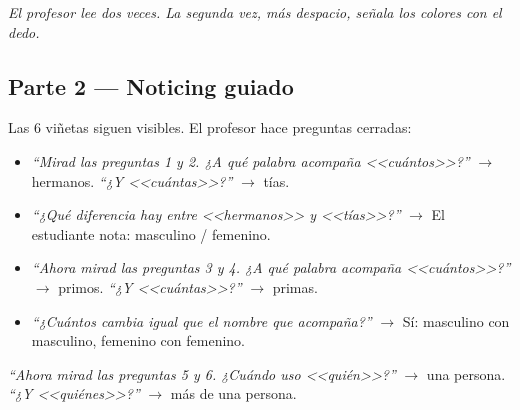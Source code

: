 \documentclass[a4paper,10pt]{article}
\begin{document}
\vspace{0.15cm}

{\small\textit{El profesor lee dos veces. La segunda vez, más despacio, señala los colores con el dedo.}}

\vspace{0.4cm}

\subsection*{\textcolor{naranja}{Parte 2 --- Noticing guiado}}

{\small Las 6 viñetas siguen visibles. El profesor hace preguntas cerradas:}

\vspace{0.2cm}

\begin{tcolorbox}[colback=naranja!5, colframe=naranja!60, boxrule=0.5pt, arc=2pt, left=6pt, right=6pt]
\begin{itemize}[leftmargin=0.5cm, itemsep=3pt]
\item \textit{``Mirad las preguntas 1 y 2. ¿A qué palabra acompaña <<cuántos>>?''} $\to$ hermanos. \textit{``¿Y <<cuántas>>?''} $\to$ tías.
\item \textit{``¿Qué diferencia hay entre <<hermanos>> y <<tías>>?''} $\to$ El estudiante nota: masculino / femenino.
\item \textit{``Ahora mirad las preguntas 3 y 4. ¿A qué palabra acompaña <<cuántos>>?''} $\to$ primos. \textit{``¿Y <<cuántas>>?''} $\to$ primas.
\item \textit{``¿Cuántos cambia igual que el nombre que acompaña?''} $\to$ Sí: masculino con masculino, femenino con femenino.
\end{itemize}
\end{tcolorbox}

\vspace{0.2cm}

\begin{center}
\end{center}

\vspace{0.2cm}

\begin{tcolorbox}[colback=naranja!5, colframe=naranja!60, boxrule=0.5pt, arc=2pt, left=6pt, right=6pt]
\textit{``Ahora mirad las preguntas 5 y 6. ¿Cuándo uso <<quién>>?''} $\to$ una persona. \textit{``¿Y <<quiénes>>?''} $\to$ más de una persona.
\end{tcolorbox}
\end{document}
